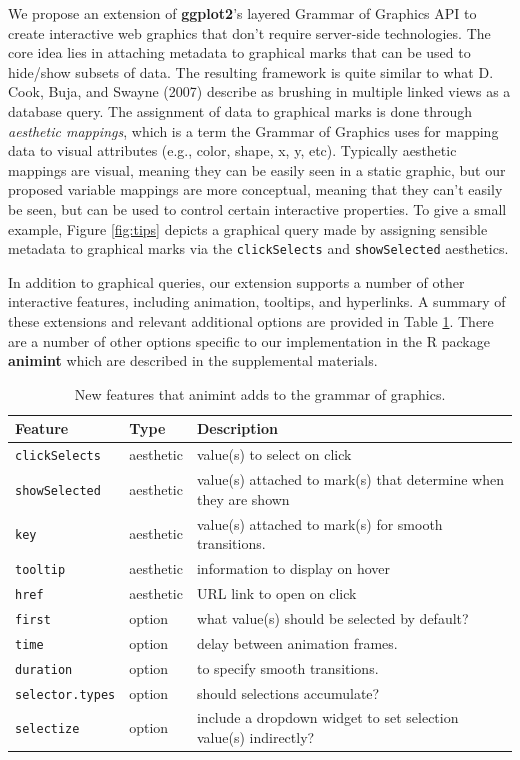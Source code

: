 \documentclass[12pt,]{article}
\theoremstyle{definition}
\theoremstyle{definition}
\theoremstyle{definition}
\theoremstyle{remark}
\begin{document}
We propose an extension of \textbf{ggplot2}'s layered Grammar of
Graphics API to create interactive web graphics that don't require
server-side technologies. The core idea lies in attaching metadata to
graphical marks that can be used to hide/show subsets of data. The
resulting framework is quite similar to what D. Cook, Buja, and Swayne
(2007) describe as brushing in multiple linked views as a database
query. The assignment of data to graphical marks is done through
\emph{aesthetic mappings}, which is a term the Grammar of Graphics uses
for mapping data to visual attributes (e.g., color, shape, x, y, etc).
Typically aesthetic mappings are visual, meaning they can be easily seen
in a static graphic, but our proposed variable mappings are more
conceptual, meaning that they can't easily be seen, but can be used to
control certain interactive properties. To give a small example, Figure
\ref{fig:tips} depicts a graphical query made by assigning sensible
metadata to graphical marks via the \texttt{clickSelects} and
\texttt{showSelected} aesthetics.

In addition to graphical queries, our extension supports a number of
other interactive features, including animation, tooltips, and
hyperlinks. A summary of these extensions and relevant additional
options are provided in Table \ref{tab:overview}. There are a number of
other options specific to our implementation in the R package
\textbf{animint} which are described in the supplemental materials.

\begin{table}

\caption{
New features that animint adds to the grammar of graphics.
}\label{tab:overview}
\small
\begin{tabularx}{\textwidth}{|l|l|l|}
\hline
Feature & Type & Description \\
\hline
\texttt{clickSelects} & aesthetic & value(s) to select on click \\
\texttt{showSelected} & aesthetic & value(s) attached to mark(s) that determine when they are shown  \\
\texttt{key} & aesthetic & value(s) attached to mark(s) for smooth transitions. \\
\texttt{tooltip} & aesthetic & information to display on hover \\
\texttt{href} & aesthetic & URL link to open on click \\
\texttt{first} & option & what value(s) should be selected by default?  \\
\texttt{time} & option & delay between animation frames.  \\
\texttt{duration} & option & to specify smooth transitions.  \\
\texttt{selector.types} & option & should selections accumulate?  \\
\texttt{selectize} & option & include a dropdown widget to set selection value(s) indirectly? \\
\hline
\end{tabularx}

\end{table}
\end{document}
